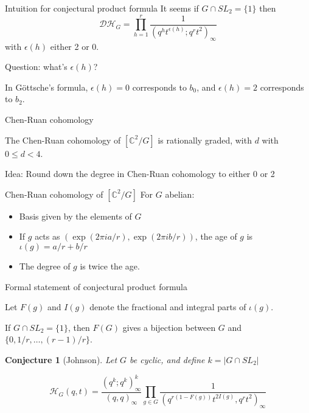 \documentclass{beamer}
\newcommand{\C}{\mathbb{C}}
\newtheorem{conjecture}{Conjecture}
\begin{document}
\begin{frame}{Intuition for conjectural product formula}
 It seems if $G\cap SL_2=\{1\}$ then
$$\mathcal{DH}_{G}=\prod_{h=1}^r \frac{1}{(q^h t^{\epsilon(h)}; q^r t^2)_\infty}$$
with $\epsilon(h)$ either 2 or 0. 

\begin{block}{Question: what's $\epsilon(h)$?}\end{block}

In G\"ottsche's formula, $\epsilon(h)=0$ corresponds to $b_0$, and $\epsilon(h)=2$ corresponds to $b_2$.
\end{frame}


\begin{frame}{Chen-Ruan cohomology}



The Chen-Ruan cohomology of $[\C^2/G]$ is rationally graded, with $d$ with $0\leq d < 4$.

\begin{block}{Idea: Round down the degree in Chen-Ruan cohomology to either 0 or 2}
\end{block}



\begin{block}{ Chen-Ruan cohomology of $[\C^2/G]$ }
For $G$ abelian:
\begin{itemize}
\item Basis given by the elements of $G$
\item If $g$ acts as $(\exp(2\pi i a/r),\exp(2\pi i b/r))$, the \alert{age} of $g$ is $\iota(g)=a/r+b/r$
\item The degree of $g$ is twice the age.
\end{itemize}
\end{block}



\end{frame}

\begin{frame}{Formal statement of conjectural product formula}



Let $F(g)$ and $I(g)$ denote the fractional and integral parts of $\iota(g)$. 

If $G\cap SL_2=\{1\}$, then $F(G)$ gives a bijection between $G$ and $\{0, 1/r,\dots, (r-1)/r\}$.
\begin{conjecture}[Johnson]
Let $G$ be cyclic, and define $k=|G\cap SL_2|$

$$\mathcal{H}_G(q,t)= \frac{(q^k;q^k)^k_\infty}{(q,q)_\infty} \prod_{g\in G}\frac{1}{(q^{r(1-F(g))} t^{2I(g)},q^rt^2)_\infty}$$

\end{conjecture}

\end{frame}
\end{document}

